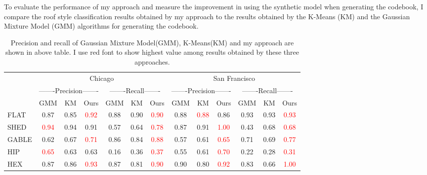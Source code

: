\documentclass{iitthesis}
\begin{document}
To evaluate the performance of my approach and measure the improvement in using the synthetic model when generating the codebook, I compare the roof style classification results obtained by my approach to the results obtained by the K-Means (KM) and the Gaussian Mixture Model (GMM) algorithms for generating the codebook.

\begin{table}[t]
\caption{Precision and recall of Gaussian Mixture Model(GMM), K-Means(KM) and my approach are shown in above table. I use red font to show highest value among results obtained by these three approaches.}
\centering
\scalebox{0.8}
{
\begin{tabular}{ccccccccccccc}
\hline \hline
&\multicolumn{6}{c}{{Chicago}} & \multicolumn{6}{c}{{San Francisco}}\\ 


&\multicolumn{3}{c}{{-------Precision-------}} & \multicolumn{3}{c}{{-------Recall-------}} & \multicolumn{3}{c}{{-------Precision-------}} & \multicolumn{3}{c}{{-------Recall-------}}\\


&\multicolumn{1}{c}{GMM} & {KM} & {Ours} & {GMM} & {KM} & {Ours} & {GMM} & {KM} & {Ours} & {GMM} & {KM} & {Ours}\\
\hline

\multicolumn{1}{l}{{FLAT}} & 
\multicolumn{1}{c}{0.87} & 0.85 & \textcolor{red}{0.92} & 
0.88 & 0.90 & \textcolor{red}{0.90} & 
0.88 & \textcolor{red}{0.88} & 0.86 & 
0.93 & 0.93 & \textcolor{red}{0.93}\\


\multicolumn{1}{l}{{SHED}} & 
\multicolumn{1}{c}{\textcolor{red}{0.94}} & 0.94 & 0.91 & 
0.57 & 0.64 & \textcolor{red}{0.78} & 
0.87 & 0.91 & \textcolor{red}{1.00} & 
0.43 & 0.68 & \textcolor{red}{0.68}\\


\multicolumn{1}{l}{{GABLE}} & 
\multicolumn{1}{c}{0.62} & 0.67 & \textcolor{red}{0.71} & 
0.86 & 0.84 & \textcolor{red}{0.88} & 
0.57 & 0.61 & \textcolor{red}{0.65} & 
0.71 & 0.69 & \textcolor{red}{0.77}\\


\multicolumn{1}{l}{{HIP}} & 
\multicolumn{1}{c}{\textcolor{red}{0.65}} & 0.63 & 0.63 & 
0.16 & 0.36 & \textcolor{red}{0.37} & 
0.55 & 0.61 & \textcolor{red}{0.70} & 
0.22 & 0.28 & \textcolor{red}{0.31}\\


\multicolumn{1}{l}{{HEX}} & 
\multicolumn{1}{c}{0.87} & 0.86 & \textcolor{red}{0.93} & 
0.87 & 0.81 & \textcolor{red}{0.90} & 
0.90 & 0.80 & \textcolor{red}{0.92} & 
0.83 & 0.66 & \textcolor{red}{1.00}\\



\end{tabular}}
\end{table}
\end{document}
